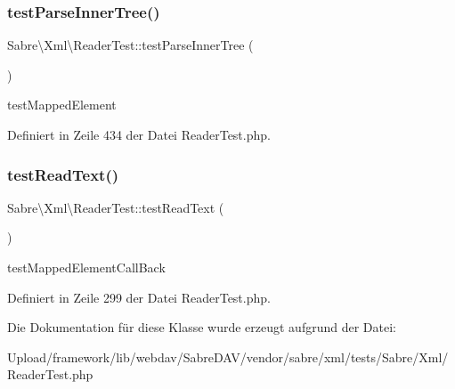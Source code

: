 \subsubsection{\texorpdfstring{test\+Parse\+Inner\+Tree()}{testParseInnerTree()}}
{\footnotesize\ttfamily Sabre\textbackslash{}\+Xml\textbackslash{}\+Reader\+Test\+::test\+Parse\+Inner\+Tree (\begin{DoxyParamCaption}{ }\end{DoxyParamCaption})}

test\+Mapped\+Element 

Definiert in Zeile 434 der Datei Reader\+Test.\+php.

\mbox{\label{class_sabre_1_1_xml_1_1_reader_test_a49fab39e675f5ffcd5bb756db6bb9074}} 
\subsubsection{\texorpdfstring{test\+Read\+Text()}{testReadText()}}
{\footnotesize\ttfamily Sabre\textbackslash{}\+Xml\textbackslash{}\+Reader\+Test\+::test\+Read\+Text (\begin{DoxyParamCaption}{ }\end{DoxyParamCaption})}

test\+Mapped\+Element\+Call\+Back 

Definiert in Zeile 299 der Datei Reader\+Test.\+php.



Die Dokumentation für diese Klasse wurde erzeugt aufgrund der Datei\+:\begin{DoxyCompactItemize}
\item 
Upload/framework/lib/webdav/\+Sabre\+D\+A\+V/vendor/sabre/xml/tests/\+Sabre/\+Xml/Reader\+Test.\+php\end{DoxyCompactItemize}
